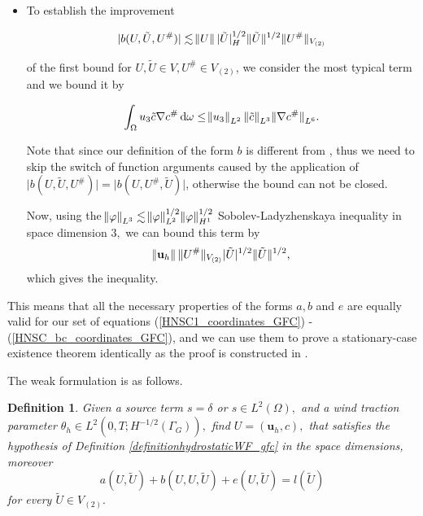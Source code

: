 \documentclass[12pt]{report}
\numberwithin{theorem}{chapter}
\numberwithin{corollary}{chapter}
\numberwithin{lemma}{chapter}
\numberwithin{remark}{chapter}
\newtheorem{definition}{Definition}
\numberwithin{definition}{chapter}
\numberwithin{prop}{chapter}
\newcommand*\diff{\mathop{}\!\mathrm{d}}
\begin{document}
\begin{itemize}
  observing that the boundary terms disappear.
  
  \item To establish the improvement
  
  $$ \lvert b(U, \tilde{U}, U^\#) \rvert \lesssim \norm{U} \lvert \tilde{U} \rvert _H^{1/2} \| \tilde{U} \| ^{1/2} \| U^\# \| _{V_{(2)}} $$
  
  of the first bound for $U, \tilde{U} \in V, U^{\#} \in V_{(2)}$, we consider the most typical term and we bound it by
  
  \[  \int_\Omega u_3 \tilde{c} \nabla c^\# \diff \omega \leq \norm{u_3}_{L^2} {\| \tilde{c} \|}_{L^3} {\| \nabla c^\# \|}_{L^6}.\]
  
Note that since our definition of the form $b$ is different from \cite{temam2005some}, thus we need to skip the switch of function arguments caused by the application of $ \lvert b(U, \tilde{U}, U^\#) \rvert = \lvert b(U, U^\#, \tilde{U}) \rvert$, otherwise the bound can not be closed.
  
Now, using the $\norm{\varphi}_{L^3} \lesssim \norm{\varphi}_{L^2}^{1/2} \norm{\varphi}_{H^1}^{1/2}$ Sobolev-Ladyzhenskaya inequality in space dimension $3,$ we can bound this term by
\[ \norm{\mathbf{u}_h} \| U^\# \| _{V_{(2)}} \lvert \tilde{U} \rvert ^ {1/2} \| \tilde{U} \| ^{1/2} ,\]
which gives the inequality.

\end{itemize}

This means that all the necessary properties of the forms $a, b$ and $e$ are equally valid for our set of equations (\ref{HNSC1_coordinates_GFC}) - (\ref{HNSC_bc_coordinates_GFC}), and we can use them to prove a stationary-case existence theorem identically as the proof is constructed in \cite{temam2005some}. 

The weak formulation is as follows.



\begin{definition}
Given a source term $s = \delta$ or $s \in L^2(\Omega),$ and a wind traction parameter $\theta_h \in L^2(0,T;H^{-1/2}(\Gamma_G)),$ find $U = (\mathbf{u}_h, c),$ that satisfies the hypothesis of Definition \ref{definitionhydrostaticWF_gfc} in the space dimensions, moreover
\begin{equation} \label{FWSTAT} a(U, \tilde{U}) + b(U,U, \tilde{U}) + e(U, \tilde{U}) = l(\tilde{U}) \end{equation}
for every $\tilde{U} \in V_{(2)}.$
\end{definition}
\end{document}
